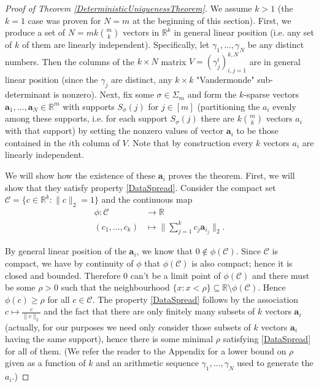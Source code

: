 \documentclass[journal, onecolumn]{IEEEtran}
\begin{document}
\begin{proof}[Proof of Theorem \ref{DeterministicUniquenessTheorem}]
We assume $k > 1$ (the $k=1$ case was proven for $N=m$ at the beginning of this section). First, we produce a set of $N = mk{m \choose k}$ vectors in $\mathbb{R}^k$ in general linear position (i.e. any set of $k$ of them are linearly independent). Specifically, let $\gamma_1, ..., \gamma_N$ be any distinct numbers. Then the columns of the $k \times N$ matrix $V = (\gamma^i_j)^{k,N}_{i,j=1}$ are in general linear position (since the $\gamma_j$ are distinct, any $k \times k$ "Vandermonde" sub-determinant is nonzero). Next, fix some $\sigma \in \Sigma_m$ and form the $k$-sparse vectors $\mathbf{a}_1, \ldots, \mathbf{a}_N \in \mathbb{R}^m$ with supports $S_\sigma(j)$ for $j \in [m]$ (partitioning the $a_i$ evenly among these supports, i.e. for each support $S_\sigma(j)$ there are $k{m \choose k}$ vectors $a_i$ with that support) by setting the nonzero values of vector $\mathbf{a}_i$ to be those contained in the $i$th column of $V$. Note that by construction every $k$ vectors $a_i$ are linearly independent. 

We will show how the existence of these $\mathbf{a}_i$ proves the theorem. First, we will show that they satisfy property \eqref{DataSpread}. Consider the compact set $\mathcal{C} = \{c \in \mathbb{R}^k: \|c\|_2 = 1\}$ and the continuous map
\begin{align*}
\phi: \mathcal{C} &\to \mathbb{R} \\
(c_1, ..., c_k) &\mapsto \|\sum_{j = 1}^k c_j \mathbf{a}_{i_j}\|_2.
\end{align*}

By general linear position of the $\mathbf{a}_i$, we know that $0 \notin \phi(\mathcal{C})$. Since $\mathcal{C}$ is compact, we have by continuity of $\phi$ that $\phi(\mathcal{C})$ is also compact; hence it is closed and bounded. Therefore $0$ can't be a limit point of $\phi(\mathcal{C})$ and there must be some $\rho > 0$ such that the neighbourhood $\{x: x < \rho\} \subseteq \mathbb{R} \setminus \phi(\mathcal{C})$. Hence $\phi(c) \geq \rho$ for all $c \in \mathcal{C}$. The property \eqref{DataSpread} follows by the association $c \mapsto \frac{c}{\|c\|_2}$ and the fact that there are only finitely many subsets of $k$ vectors $\mathbf{a}_i$ (actually, for our purposes we need only consider those subsets of $k$ vectors $\mathbf{a}_i$ having the same support), hence there is some minimal $\rho$ satisfying \eqref{DataSpread} for all of them. (We refer the reader to the Appendix for a lower bound on $\rho$ given as a function of $k$ and an arithmetic sequence $\gamma_1, \ldots, \gamma_N$ used to generate the $a_i$.)


\end{proof}
\end{document}
